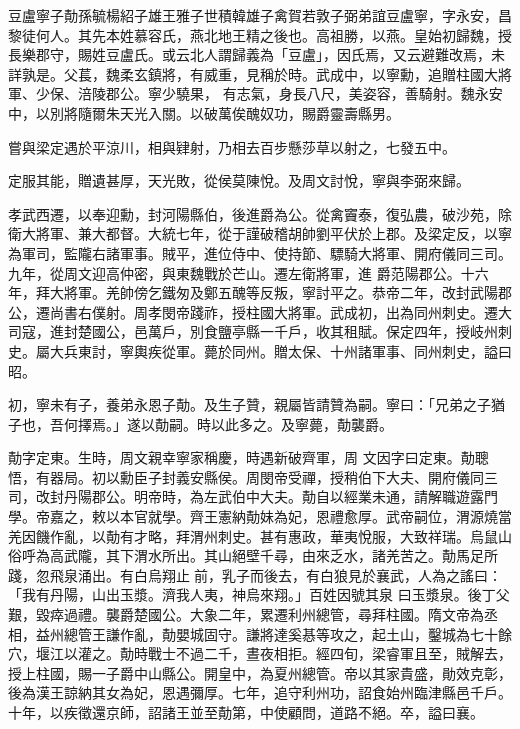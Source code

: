 
\begin{pinyinscope}

 豆盧寧子勣孫毓楊紹子雄王雅子世積韓雄子禽賀若敦子弼弟誼豆盧寧，字永安，昌黎徒何人。其先本姓慕容氏，燕北地王精之後也。高祖勝，以燕。皇始初歸魏，授長樂郡守，賜姓豆盧氏。或云北人謂歸義為「豆盧」，因氏焉，又云避難改焉，未詳孰是。父萇，魏柔玄鎮將，有威重，見稱於時。武成中，以寧勳，追贈柱國大將軍、少保、涪陵郡公。寧少驍果，
 有志氣，身長八尺，美姿容，善騎射。魏永安中，以別將隨爾朱天光入關。以破萬俟醜奴功，賜爵靈壽縣男。



 嘗與梁定遇於平涼川，相與肄射，乃相去百步懸莎草以射之，七發五中。



 定服其能，贈遺甚厚，天光敗，從侯莫陳悅。及周文討悅，寧與李弼來歸。



 孝武西遷，以奉迎勳，封河陽縣伯，後進爵為公。從禽竇泰，復弘農，破沙苑，除衛大將軍、兼大都督。大統七年，從于謹破稽胡帥劉平伏於上郡。及梁定反，以寧為軍司，監隴右諸軍事。賊平，進位侍中、使持節、驃騎大將軍、開府儀同三司。九年，從周文迎高仲密，與東魏戰於芒山。遷左衛將軍，進
 爵范陽郡公。十六年，拜大將軍。羌帥傍乞鐵匆及鄭五醜等反叛，寧討平之。恭帝二年，改封武陽郡公，遷尚書右僕射。周孝閔帝踐祚，授柱國大將軍。武成初，出為同州刺史。遷大司寇，進封楚國公，邑萬戶，別食鹽亭縣一千戶，收其租賦。保定四年，授岐州刺史。屬大兵東討，寧輿疾從軍。薨於同州。贈太保、十州諸軍事、同州刺史，謚曰昭。



 初，寧未有子，養弟永恩子勣。及生子贊，親屬皆請贊為嗣。寧曰：「兄弟之子猶子也，吾何擇焉。」遂以勣嗣。時以此多之。及寧薨，勣襲爵。



 勣字定東。生時，周文親幸寧家稱慶，時遇新破齊軍，周
 文因字曰定東。勣聰悟，有器局。初以勳臣子封義安縣侯。周閔帝受禪，授稍伯下大夫、開府儀同三司，改封丹陽郡公。明帝時，為左武伯中大夫。勣自以經業未通，請解職遊露門學。帝嘉之，敕以本官就學。齊王憲納勣妹為妃，恩禮愈厚。武帝嗣位，渭源燒當羌因饑作亂，以勣有才略，拜渭州刺史。甚有惠政，華夷悅服，大致祥瑞。烏鼠山俗呼為高武隴，其下渭水所出。其山絕壁千尋，由來乏水，諸羌苦之。勣馬足所踐，忽飛泉涌出。有白烏翔止前，乳子而後去，有白狼見於襄武，人為之謠曰：「我有丹陽，山出玉漿。濟我人夷，神烏來翔。」百姓因號其泉
 曰玉漿泉。後丁父艱，毀瘁過禮。襲爵楚國公。大象二年，累遷利州總管，尋拜柱國。隋文帝為丞相，益州總管王謙作亂，勣嬰城固守。謙將達奚惎等攻之，起土山，鑿城為七十餘穴，堰江以灌之。勣時戰士不過二千，晝夜相拒。經四旬，梁睿軍且至，賊解去，授上柱國，賜一子爵中山縣公。開皇中，為夏州總管。帝以其家貴盛，勛效克彰，後為漢王諒納其女為妃，恩遇彌厚。七年，追守利州功，詔食始州臨津縣邑千戶。十年，以疾徵還京師，詔諸王並至勣第，中使顧問，道路不絕。卒，謚曰襄。




\end{pinyinscope}
